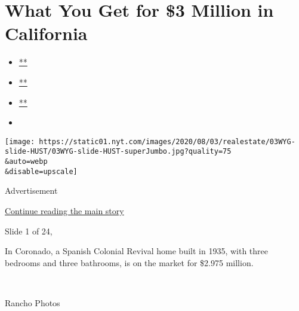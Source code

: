 \hypertarget{what-you-get-for-3-million-in-california}{%
\section{What You Get for \$3 Million in
California}\label{what-you-get-for-3-million-in-california}}

\begin{itemize}
\item
  \href{https://www.facebook.com/sharer.php?app_id=9869919170\&u=https\%3A\%2F\%2Fwww.nytimes.com\%2Fslideshow\%2F2020\%2F08\%2F03\%2Frealestate\%2Fwhat-you-get-for-3-million-in-california.html\%3Fsmid\%3Dfb-share\&name=What\%20You\%20Get\%20for\%20\%243\%20Million\%20in\%20California\&redirect_uri=https\%3A\%2F\%2Fwww.facebook.com\%2F}{**}
\item
  \href{https://twitter.com/intent/tweet?url=https\%3A\%2F\%2Fwww.nytimes.com\%2Fslideshow\%2F2020\%2F08\%2F03\%2Frealestate\%2Fwhat-you-get-for-3-million-in-california.html\%3Fsmid\%3Dtw-share\&text=What\%20You\%20Get\%20for\%20\%243\%20Million\%20in\%20California}{**}
\item
  \href{mailto:?subject=NYTimes.com\%3A\%20What\%20You\%20Get\%20for\%20\%243\%20Million\%20in\%20California\&body=From\%20The\%20New\%20York\%20Times\%3A\%0A\%0AWhat\%20You\%20Get\%20for\%20\%243\%20Million\%20in\%20California\%0A\%0AA\%20Spanish-style\%20retreat\%20in\%20Coronado\%2C\%20a\%20midcentury-modern\%20home\%20in\%20Piedmont\%20and\%20a\%20remodeled\%201953\%20house\%20in\%20Los\%20Angeles.\%0A\%0Ahttps\%3A\%2F\%2Fwww.nytimes.com\%2Fslideshow\%2F2020\%2F08\%2F03\%2Frealestate\%2Fwhat-you-get-for-3-million-in-california.html\%3Fsmid\%3Dem-share}{**}
\item
\end{itemize}

\texttt{[image: https://static01.nyt.com/images/2020/08/03/realestate/03WYG-slide-HUST/03WYG-slide-HUST-superJumbo.jpg?quality=75\\\&auto=webp\\\&disable=upscale]}

Advertisement

\protect\hyperlink{after-right-0}{Continue reading the main story}

Slide 1 of 24,

In Coronado, a Spanish Colonial Revival home built in 1935, with three
bedrooms and three bathrooms, is on the market for \$2.975 million.

~

Rancho Photos

